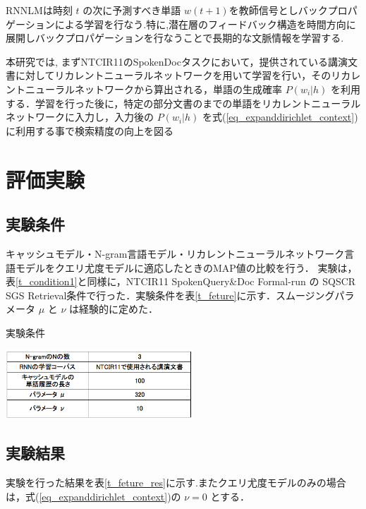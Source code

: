 
RNNLMは時刻 $t$ の次に予測すべき単語 $w(t+1)$を教師信号としバックプロパゲーションによる学習を行なう.特に,潜在層のフィードバック構造を時間方向に展開しバックプロパゲーションを行なうことで長期的な文脈情報を学習する.

本研究では, まずNTCIR11のSpokenDocタスクにおいて，提供されている講演文書に対してリカレントニューラルネットワークを用いて学習を行い，そのリカレントニューラルネットワークから算出される，単語の生成確率 $P(w_i|h)$ を利用する．学習を行った後に，特定の部分文書のまでの単語をリカレントニューラルネットワークに入力し，入力後の $P(w_i|h)$ を式(\ref{eq_expanddirichlet_context})に利用する事で検索精度の向上を図る

\section{評価実験}
\subsection{実験条件}

キャッシュモデル・N-gram言語モデル・リカレントニューラルネットワーク言語モデルをクエリ尤度モデルに適応したときのMAP値の比較を行う．
実験は，表\ref{t_condition1}と同様に，NTCIR11 SpokenQuery\&Doc Formal-run の SQSCR SGS Retrieval条件で行った．実験条件を表\ref{t_feture}に示す．スムージングパラメータ $\mu$ と $\nu$ は経験的に定めた．

\begin{table}[h]
    \centering
    \caption{実験条件}
    \includegraphics[width=7cm]{./image/t_feature1.png}
    \label{t_feture}
\end{table}

\subsection{実験結果}

実験を行った結果を表\ref{t_feture_res}に示す.またクエリ尤度モデルのみの場合は，式(\ref{eq_expanddirichlet_context})の $\nu = 0$ とする．

